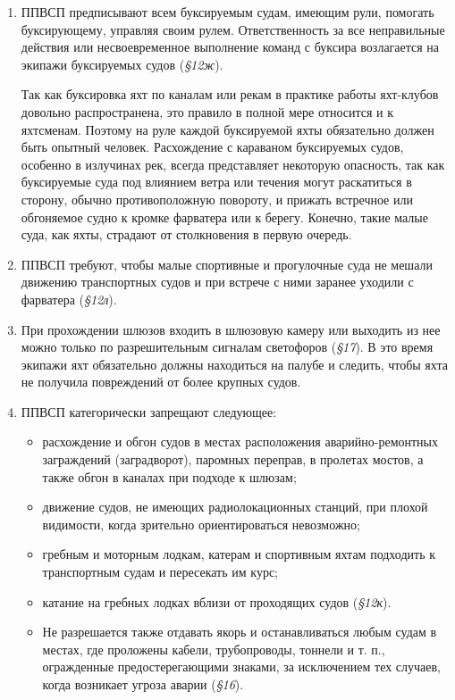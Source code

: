 \documentclass[a4paper, 12pt, twoside, final]{scrbook}
\begin{document}
\begin{enumerate}
\item ППВСП предписывают всем буксируемым судам, имеющим рули, помогать буксирующему, управляя своим рулем. Ответственность за все неправильные действия или несвоевременное выполнение команд с буксира возлагается на экипажи буксируемых судов (\textit{\S 12ж}).

Так как буксировка яхт по каналам или рекам в практике работы яхт-клубов довольно распространена, это правило в полной мере относится и к яхтсменам. Поэтому на руле каждой буксируемой яхты обязательно должен быть опытный человек. Расхождение с караваном буксируемых судов, особенно в излучинах рек, всегда представляет некоторую опасность, так как буксируемые суда под влиянием ветра или течения могут раскатиться в сторону, обычно противоположную повороту, и прижать встречное или обгоняемое судно к кромке фарватера или к берегу. Конечно, такие малые суда, как яхты, страдают от столкновения в первую очередь.

\item ППВСП требуют, чтобы малые спортивные и прогулочные суда не мешали движению транспортных судов и при встрече с ними заранее уходили с фарватера (\textit{\S 12л}).

\item При прохождении шлюзов входить в шлюзовую камеру или выходить из нее можно только по разрешительным сигналам светофоров (\textit{§17}). В это время экипажи яхт обязательно должны находиться на палубе и следить, чтобы яхта не получила повреждений от более крупных судов.

\item ППВСП категорически запрещают следующее:

\begin{itemize}
\item расхождение и обгон судов в местах расположения аварийно-ремонтных заграждений (заградворот), паромных переправ, в пролетах мостов, а также обгон в каналах при подходе к шлюзам;
\item движение судов, не имеющих радиолокационных станций, при плохой видимости, когда зрительно ориентироваться невозможно;
\item гребным и моторным лодкам, катерам и спортивным яхтам подходить к транспортным судам и пересекать им курс;
\item катание на гребных лодках вблизи от проходящих судов (\textit{\S 12к}).
\item Не разрешается также отдавать якорь и останавливаться любым судам в местах, где проложены кабели, трубопроводы, тоннели и т. п., огражденные предостерегающими знаками, за исключением тех случаев, когда возникает угроза аварии (\textit{\S 16}).
\end{itemize}
\end{enumerate}
\end{document}

